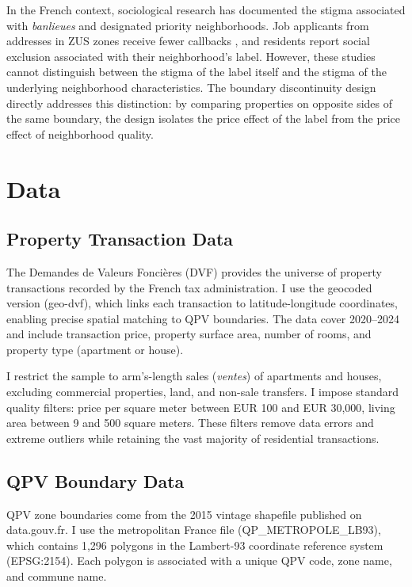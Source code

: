 \documentclass[12pt]{article}
\begin{document}
In the French context, sociological research has documented the stigma associated with \textit{banlieues} and designated priority neighborhoods. Job applicants from addresses in ZUS zones receive fewer callbacks \citep{duguet2010discrimination}, and residents report social exclusion associated with their neighborhood's label. However, these studies cannot distinguish between the stigma of the label itself and the stigma of the underlying neighborhood characteristics. The boundary discontinuity design directly addresses this distinction: by comparing properties on opposite sides of the same boundary, the design isolates the price effect of the label from the price effect of neighborhood quality.


\section{Data} \label{sec:data}

\subsection{Property Transaction Data}

The Demandes de Valeurs Fonci\`{e}res (DVF) provides the universe of property transactions recorded by the French tax administration. I use the geocoded version (geo-dvf), which links each transaction to latitude-longitude coordinates, enabling precise spatial matching to QPV boundaries. The data cover 2020--2024 and include transaction price, property surface area, number of rooms, and property type (apartment or house).

I restrict the sample to arm's-length sales (\textit{ventes}) of apartments and houses, excluding commercial properties, land, and non-sale transfers. I impose standard quality filters: price per square meter between EUR 100 and EUR 30,000, living area between 9 and 500 square meters. These filters remove data errors and extreme outliers while retaining the vast majority of residential transactions.

\subsection{QPV Boundary Data}

QPV zone boundaries come from the 2015 vintage shapefile published on data.gouv.fr. I use the metropolitan France file (QP\_METROPOLE\_LB93), which contains 1,296 polygons in the Lambert-93 coordinate reference system (EPSG:2154). Each polygon is associated with a unique QPV code, zone name, and commune name.
\end{document}

